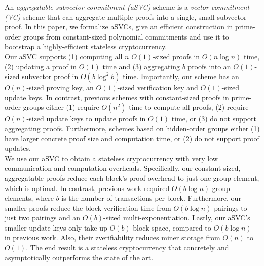 An \textit{aggregatable subvector commitment (aSVC)} scheme is a \textit{vector commitment (VC)} scheme that can aggregate multiple proofs into a single, small subvector proof.
In this paper, we formalize aSVCs, give an efficient construction in prime-order groups from constant-sized polynomial commitments and use it to bootstrap a highly-efficient stateless cryptocurrency.
\\

Our aSVC supports (1) computing all $n$ $O(1)$-sized proofs in $O(n\log{n})$ time, (2) updating a proof in $O(1)$ time and (3) aggregating $b$ proofs into an $O(1)$-sized subvector proof in $O(b\log^2{b})$ time.
Importantly, our scheme has an $O(n)$-sized proving key, an $O(1)$-sized verification key and $O(1)$-sized update keys.
In contrast, previous schemes with constant-sized proofs in prime-order groups either (1) require $O(n^2)$ time to compute all proofs, (2) require $O(n)$-sized update keys to update proofs in $O(1)$ time, or (3) do not support aggregating proofs.
Furthermore, schemes based on hidden-order groups either (1) have larger concrete proof size and computation time, or (2) do not support proof updates.
\\

We use our aSVC to obtain a stateless cryptocurrency with very low communication and computation overheads.
Specifically, our constant-sized, aggregatable proofs reduce each block's proof overhead to just one group element, which is optimal.
In contrast, previous work required $O(b\log{n})$ group elements, where $b$ is the number of transactions per block.
Furthermore, our smaller proofs reduce the block verification time from $O(b\log{n})$ pairings to just two pairings and an $O(b)$-sized multi-exponentiation.
Lastly, our aSVC's smaller update keys only take up $O(b)$ block space, compared to $O(b\log{n})$ in previous work.
Also, their zverifiability reduces miner storage from $O(n)$ to $O(1)$.
The end result is a stateless cryptocurrency that concretely and asymptotically outperforms the state of the art.